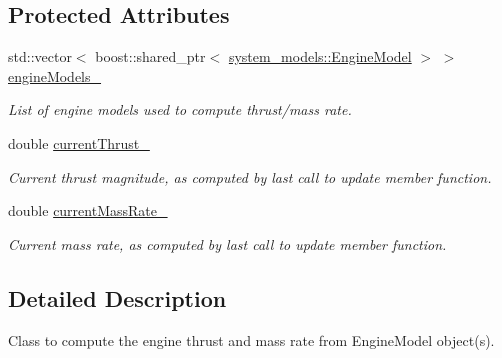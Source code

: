 \subsection*{Protected Attributes}
\begin{DoxyCompactItemize}
\item 
std\+::vector$<$ boost\+::shared\+\_\+ptr$<$ \hyperlink{classtudat_1_1system__models_1_1EngineModel}{system\+\_\+models\+::\+Engine\+Model} $>$ $>$ \hyperlink{classtudat_1_1propulsion_1_1ThrustMagnitudeFromEngineWrapper_a0585b24f9404b9a570087ee67b225227}{engine\+Models\+\_\+}\hypertarget{classtudat_1_1propulsion_1_1ThrustMagnitudeFromEngineWrapper_a0585b24f9404b9a570087ee67b225227}{}\label{classtudat_1_1propulsion_1_1ThrustMagnitudeFromEngineWrapper_a0585b24f9404b9a570087ee67b225227}

\begin{DoxyCompactList}\small\item\em List of engine models used to compute thrust/mass rate. \end{DoxyCompactList}\item 
double \hyperlink{classtudat_1_1propulsion_1_1ThrustMagnitudeFromEngineWrapper_adbe1d232b6363786f9cd1e785415ab6f}{current\+Thrust\+\_\+}\hypertarget{classtudat_1_1propulsion_1_1ThrustMagnitudeFromEngineWrapper_adbe1d232b6363786f9cd1e785415ab6f}{}\label{classtudat_1_1propulsion_1_1ThrustMagnitudeFromEngineWrapper_adbe1d232b6363786f9cd1e785415ab6f}

\begin{DoxyCompactList}\small\item\em Current thrust magnitude, as computed by last call to update member function. \end{DoxyCompactList}\item 
double \hyperlink{classtudat_1_1propulsion_1_1ThrustMagnitudeFromEngineWrapper_ae5febedd296949c8ec57b69a4a911b75}{current\+Mass\+Rate\+\_\+}\hypertarget{classtudat_1_1propulsion_1_1ThrustMagnitudeFromEngineWrapper_ae5febedd296949c8ec57b69a4a911b75}{}\label{classtudat_1_1propulsion_1_1ThrustMagnitudeFromEngineWrapper_ae5febedd296949c8ec57b69a4a911b75}

\begin{DoxyCompactList}\small\item\em Current mass rate, as computed by last call to update member function. \end{DoxyCompactList}\end{DoxyCompactItemize}


\subsection{Detailed Description}
Class to compute the engine thrust and mass rate from Engine\+Model object(s). 

